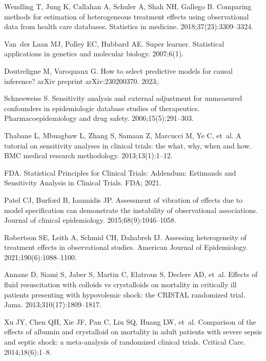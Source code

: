 \documentclass[10pt,letterpaper]{article}
\begin{document}
\begin{thebibliography}{100}
  Wendling T, Jung K, Callahan A, Schuler A, Shah NH, Gallego B.
  \newblock Comparing methods for estimation of heterogeneous treatment effects using observational data from health care databases.
  \newblock Statistics in medicine. 2018;37(23):3309--3324.

  Van~der Laan MJ, Polley EC, Hubbard AE.
  \newblock Super learner.
  \newblock Statistical applications in genetics and molecular biology. 2007;6(1).

  Doutreligne M, Varoquaux G.
  \newblock How to select predictive models for causal inference?
  \newblock arXiv preprint arXiv:230200370. 2023;.

  Schneeweiss S.
  \newblock Sensitivity analysis and external adjustment for unmeasured confounders in epidemiologic database studies of therapeutics.
  \newblock Pharmacoepidemiology and drug safety. 2006;15(5):291--303.

  Thabane L, Mbuagbaw L, Zhang S, Samaan Z, Marcucci M, Ye C, et~al.
  \newblock A tutorial on sensitivity analyses in clinical trials: the what, why, when and how.
  \newblock BMC medical research methodology. 2013;13(1):1--12.

  FDA.
  \newblock Statistical Principles for Clinical Trials: Addendum: Estimands and Sensitivity Analysis in Clinical Trials.
  \newblock FDA; 2021.

  Patel CJ, Burford B, Ioannidis JP.
  \newblock Assessment of vibration of effects due to model specification can demonstrate the instability of observational associations.
  \newblock Journal of clinical epidemiology. 2015;68(9):1046--1058.

  Robertson SE, Leith A, Schmid CH, Dahabreh IJ.
  \newblock Assessing heterogeneity of treatment effects in observational studies.
  \newblock American Journal of Epidemiology. 2021;190(6):1088--1100.

  Annane D, Siami S, Jaber S, Martin C, Elatrous S, Declere AD, et~al.
  \newblock Effects of fluid resuscitation with colloids vs crystalloids on mortality in critically ill patients presenting with hypovolemic shock: the CRISTAL randomized trial.
  \newblock Jama. 2013;310(17):1809--1817.

  Xu JY, Chen QH, Xie JF, Pan C, Liu SQ, Huang LW, et~al.
  \newblock Comparison of the effects of albumin and crystalloid on mortality in adult patients with severe sepsis and septic shock: a meta-analysis of randomized clinical trials.
  \newblock Critical Care. 2014;18(6):1--8.


\end{thebibliography}
\end{document}
